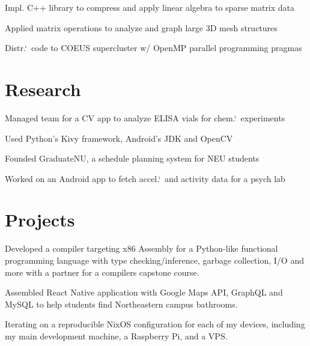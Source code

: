 \documentclass[letterpaper]{resume} %
\begin{document}
\begin{minipage}[t]{0.66\textwidth}
\begin{tightitemize}
  \item Impl. C++ library to compress and apply linear algebra to sparse matrix data
  \item Applied matrix operations to analyze and graph large 3D mesh structures
  \item Distr.`\ code to COEUS supercluster w/ OpenMP parallel programming pragmas
\end{tightitemize}

\section{Research}


\begin{tightitemize}
  \item Managed team for a CV app to analyze ELISA vials for chem.`\ experiments
  \item Used Python's Kivy framework, Android's JDK and OpenCV
  \item Founded GraduateNU, a schedule planning system for NEU students
  \item Worked on an Android app to fetch accel.`\ and activity data for a psych lab
\end{tightitemize}

\section{Projects}

Developed a compiler targeting x86 Assembly for a Python-like
functional programming language with type checking/inference,
garbage collection, I/O and more with a partner for a compilers
capstone course.
\sectionspace

Assembled React Native application with Google Maps API,
GraphQL and MySQL to help students find Northeastern campus bathrooms.
\sectionspace

Iterating on a reproducible NixOS configuration for each of my devices,
including my main development machine, a Raspberry Pi, and a VPS.\@
\sectionspace


\end{minipage}
\end{document}
